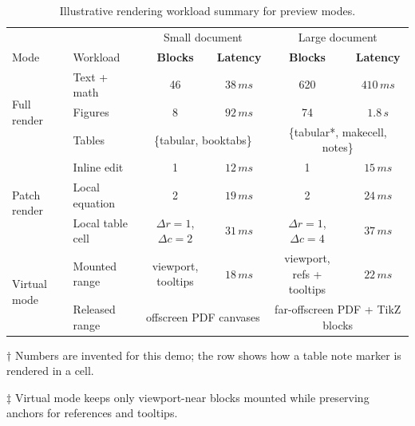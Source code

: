 \documentclass{article}
\begin{document}
\begin{table}[!ht]
\setlength\tabcolsep{0.6em}
\begin{threeparttable}
\caption{Illustrative rendering workload summary for \textbf{\snaptex} preview modes.}
\label{tab:demo-complex-table}
\centering
\begin{tabular*}{\textwidth}{l@{\extracolsep{\fill}}lcccc}
\toprule
&& \multicolumn{2}{c}{Small document} & \multicolumn{2}{c}{Large document} \\
\cmidrule(lr){3-4}\cmidrule(lr){5-6}
Mode & Workload & \textbf{Blocks} & \textbf{Latency} & \textbf{Blocks} & \textbf{Latency} \\
\midrule
\multirow{3}{*}{Full render}
& Text + math & 46 & $38\,ms$ & 620 & $410\,ms$ \\
& Figures & 8 & $92\,ms$ & 74 & $1.8\,s$\tnote{$\dagger$} \\
& Tables & \multicolumn{2}{c}{\{tabular, booktabs\}} & \multicolumn{2}{c}{\{tabular*, makecell, notes\}} \\
\cline{2-6}
\multirow{3}{*}{Patch render}
& Inline edit & 1 & $12\,ms$ & 1 & $15\,ms$ \\
& Local equation & 2 & $19\,ms$ & 2 & $24\,ms$ \\
& Local table cell & \makecell{$\Delta r=1$,\\ $\Delta c=2$} & $31\,ms$ & \makecell{$\Delta r=1$,\\ $\Delta c=4$} & $37\,ms$ \\
\cline{2-6}
\multirow{2}{*}{Virtual mode}
& Mounted range & \makecell{viewport,\\ tooltips} & $18\,ms$ & \makecell{viewport,\\ refs + tooltips} & $22\,ms$\tnote{$\ddagger$} \\
& Released range & \multicolumn{2}{c}{offscreen PDF canvases} & \multicolumn{2}{c}{far-offscreen PDF + TikZ blocks} \\
\bottomrule
\end{tabular*}
\begin{tablenotes}[flushleft]\footnotesize
    \item[$\dagger$] Numbers are invented for this demo; the row shows how a table note marker is rendered in a cell.
    \item[$\ddagger$] Virtual mode keeps only viewport-near blocks mounted while preserving anchors for references and tooltips.
\end{tablenotes}
\end{threeparttable}
\end{table}
\end{document}
